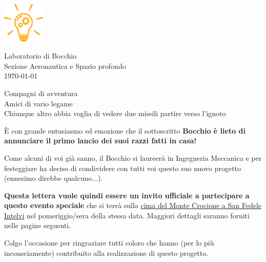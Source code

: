 \documentclass[12pt, a4paper]{article}
\begin{document}
\parbox{.35\linewidth}
{
    \begin{flushleft}
        \includegraphics[width=2cm]{Gear bulb icon.png}\\
    \end{flushleft}
}
\parbox{.6\linewidth}
{
    \begin{flushright}
        Laboratorio di Bocchio \\
        Sezione Aeronautica e Spazio profondo \\
        \vspace{1em}
        \today \\
    \end{flushright}
}

\vspace{3em}

\noindent Compagni di avventura \\
Amici di vario legame \\
Chiunque altro abbia voglia di vedere due missili partire verso l'ignoto \\

\setlength{\parindent}{0pt}
\setlength{\parskip}{1.5em}

È con grande entusiasmo ed emozione che il sottoscritto \textbf{Bocchio è lieto di annunciare il primo lancio dei suoi razzi fatti in casa!}

Come alcuni di voi già sanno, il  Bocchio si laureerà in Ingegneria Meccanica e per festeggiare ha deciso di condividere con tutti voi questo suo nuovo progetto (ennesimo direbbe qualcuno...).

\textbf{Questa lettera vuole quindi essere un invito ufficiale a partecipare a questo evento speciale} che si terrà sulla \href{https://goo.gl/maps/K2kVRpBknDxLTATeA}{cima del Monte Crocione a San Fedele Intelvi} nel pomeriggio/sera della stessa data.
Maggiori dettagli saranno forniti nelle pagine seguenti.

Colgo l'occasione per ringraziare tutti coloro che hanno (per lo più inconsciamente) contribuito alla realizzazione di questo progetto.

\vspace{3em}
\end{document}
